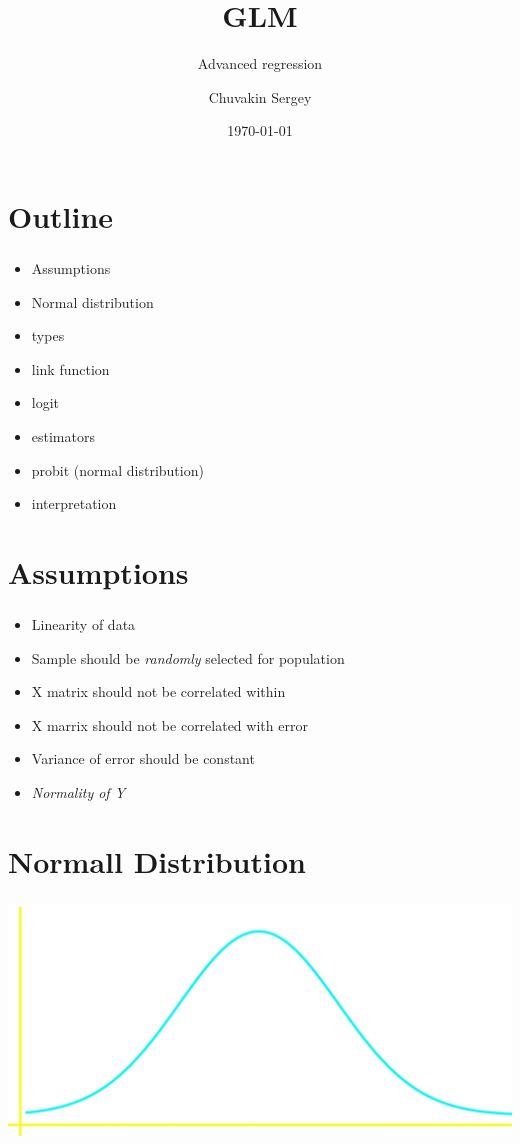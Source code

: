 \documentclass[t, 11pt]{beamer}
\title {GLM}
\subtitle{Advanced regression}
\author{Chuvakin Sergey}
\date{\today}
\institute[<<Anthropology and Sociology major>>]{<<School of Advanced Studies>>}
\begin{document}
	
	
	\frame[plain]{\titlepage}		
	
	\section{Outline}
	
	\begin{frame} 
		\frametitle{\insertsection} 
		\begin{itemize}
			\item Assumptions
			\item Normal distribution
			\item types 
			\item link function
			\item logit
			\item estimators
			\item probit (normal distribution)
			\item interpretation
		\end{itemize}
		
	\end{frame}
	
	\section{Assumptions}
		\begin{frame} 
		\frametitle{\insertsection} 
	\begin{itemize}
			\item Linearity of data
			\item Sample should be \emph{randomly} selected for population
			\item X matrix should not be correlated within
			\item X marrix should not be correlated with error
			\item Variance of error should be constant
			\item \emph{Normality of Y}
\end{itemize}

	\end{frame}
\section{Normall Distribution}
	
			\begin{frame} 
		\frametitle{\insertsection} 
		\begin{center}
			\includegraphics[scale=0.2]{bellshape}
		\end{center}
	\end{frame}
\end{document}
